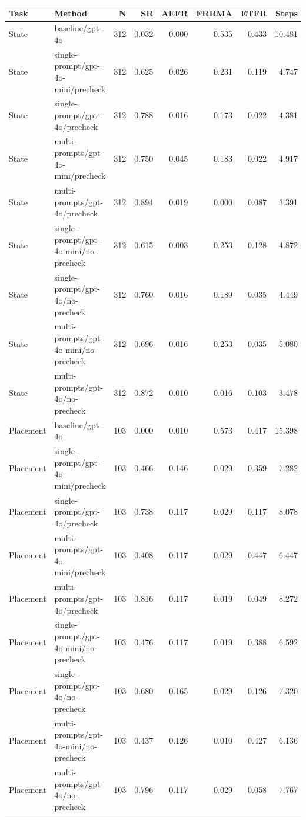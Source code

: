 \begin{tabular}{llrrrrrr}
\hline
Task & Method & N & SR & AEFR & FRRMA & ETFR & Steps \\
\hline
State & baseline/gpt-4o & 312 & 0.032 & 0.000 & 0.535 & 0.433 & 10.481 \\
State & single-prompt/gpt-4o-mini/precheck & 312 & 0.625 & 0.026 & 0.231 & 0.119 & 4.747 \\
State & single-prompt/gpt-4o/precheck & 312 & 0.788 & 0.016 & 0.173 & 0.022 & 4.381 \\
State & multi-prompts/gpt-4o-mini/precheck & 312 & 0.750 & 0.045 & 0.183 & 0.022 & 4.917 \\
State & multi-prompts/gpt-4o/precheck & 312 & 0.894 & 0.019 & 0.000 & 0.087 & 3.391 \\
State & single-prompt/gpt-4o-mini/no-precheck & 312 & 0.615 & 0.003 & 0.253 & 0.128 & 4.872 \\
State & single-prompt/gpt-4o/no-precheck & 312 & 0.760 & 0.016 & 0.189 & 0.035 & 4.449 \\
State & multi-prompts/gpt-4o-mini/no-precheck & 312 & 0.696 & 0.016 & 0.253 & 0.035 & 5.080 \\
State & multi-prompts/gpt-4o/no-precheck & 312 & 0.872 & 0.010 & 0.016 & 0.103 & 3.478 \\
Placement & baseline/gpt-4o & 103 & 0.000 & 0.010 & 0.573 & 0.417 & 15.398 \\
Placement & single-prompt/gpt-4o-mini/precheck & 103 & 0.466 & 0.146 & 0.029 & 0.359 & 7.282 \\
Placement & single-prompt/gpt-4o/precheck & 103 & 0.738 & 0.117 & 0.029 & 0.117 & 8.078 \\
Placement & multi-prompts/gpt-4o-mini/precheck & 103 & 0.408 & 0.117 & 0.029 & 0.447 & 6.447 \\
Placement & multi-prompts/gpt-4o/precheck & 103 & 0.816 & 0.117 & 0.019 & 0.049 & 8.272 \\
Placement & single-prompt/gpt-4o-mini/no-precheck & 103 & 0.476 & 0.117 & 0.019 & 0.388 & 6.592 \\
Placement & single-prompt/gpt-4o/no-precheck & 103 & 0.680 & 0.165 & 0.029 & 0.126 & 7.320 \\
Placement & multi-prompts/gpt-4o-mini/no-precheck & 103 & 0.437 & 0.126 & 0.010 & 0.427 & 6.136 \\
Placement & multi-prompts/gpt-4o/no-precheck & 103 & 0.796 & 0.117 & 0.029 & 0.058 & 7.767 \\
\hline
\end{tabular}
